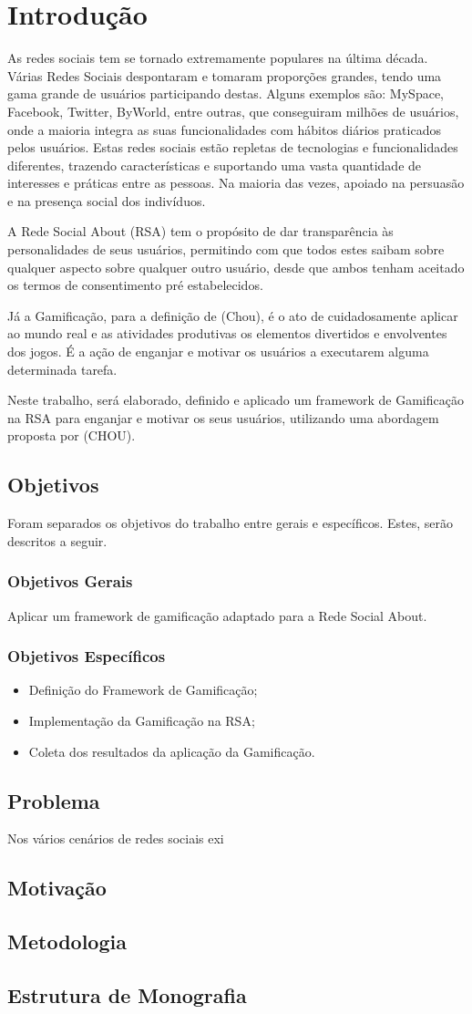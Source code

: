 \chapter[Introdução]{Introdução}
As redes sociais tem se tornado extremamente populares na última década.
Várias
Redes Sociais despontaram e tomaram proporções grandes, tendo uma gama grande
de usuários participando destas. Alguns exemplos são: MySpace, Facebook, Twitter,
ByWorld, entre outras, que conseguiram milhões de usuários, onde a maioria integra
as suas funcionalidades com hábitos diários praticados pelos usuários.
Estas redes sociais estão repletas de tecnologias e funcionalidades diferentes,
trazendo características e suportando uma vasta quantidade de interesses e práticas
entre as pessoas. Na maioria das vezes, apoiado na persuasão e na presença social
dos indivíduos.

A Rede Social About (RSA) tem o propósito de dar transparência às personalidades de seus usuários, permitindo com que todos
estes saibam sobre qualquer aspecto sobre qualquer outro usuário, desde que ambos tenham aceitado os
termos de consentimento pré estabelecidos.

Já a Gamificação, para a definição de (Chou),  é o ato de cuidadosamente aplicar ao mundo
real e as atividades produtivas os elementos divertidos e envolventes dos jogos.
É a ação de enganjar e motivar os usuários a executarem alguma determinada
tarefa. 

Neste trabalho, será elaborado, definido e aplicado um framework de Gamificação na RSA 
para enganjar e motivar os seus usuários, utilizando uma abordagem proposta por (CHOU).


\section{Objetivos}
Foram separados os objetivos do trabalho entre gerais e específicos. Estes, serão
descritos a seguir.
\subsection{Objetivos Gerais}
Aplicar um framework de  gamificação adaptado para a Rede Social About.
\subsection{Objetivos Específicos}
\begin{itemize}
    \item Definição do Framework de Gamificação;
    \item Implementação da Gamificação na RSA;
    \item Coleta dos resultados da aplicação da Gamificação.
\end{itemize}
\section{Problema}
Nos vários cenários de redes sociais exi
\section{Motivação}
\section{Metodologia}
\section{Estrutura de Monografia}
